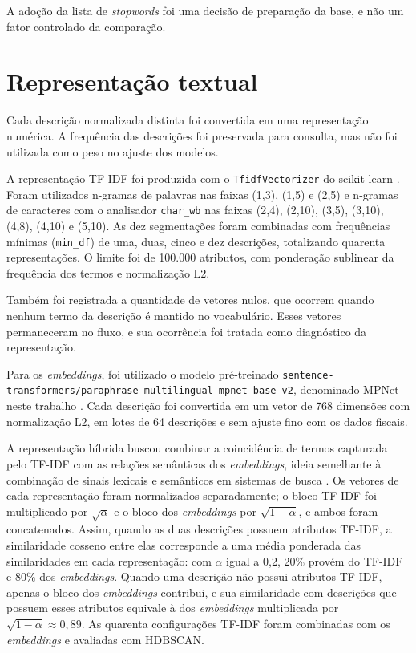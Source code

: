 \documentclass[english,brazilian]{UNISINOSmonografia}
\begin{document}
A adoção da lista de \textit{stopwords} foi uma decisão de preparação da base, e não um fator controlado da comparação.

\section{Representação textual}
\label{sec:representacao}

Cada descrição normalizada distinta foi convertida em uma representação numérica. A frequência das descrições foi preservada para consulta, mas não foi utilizada como peso no ajuste dos modelos.

A representação TF-IDF foi produzida com o \texttt{TfidfVectorizer} do scikit-learn \cite{sklearn-tfidf}. Foram utilizados n-gramas de palavras nas faixas (1,3), (1,5) e (2,5) e n-gramas de caracteres com o analisador \texttt{char\_wb} nas faixas (2,4), (2,10), (3,5), (3,10), (4,8), (4,10) e (5,10). As dez segmentações foram combinadas com frequências mínimas (\texttt{min\_df}) de uma, duas, cinco e dez descrições, totalizando quarenta representações. O limite foi de 100.000 atributos, com ponderação sublinear da frequência dos termos e normalização L2.

Também foi registrada a quantidade de vetores nulos, que ocorrem quando nenhum termo da descrição é mantido no vocabulário. Esses vetores permaneceram no fluxo, e sua ocorrência foi tratada como diagnóstico da representação.

Para os \textit{embeddings}, foi utilizado o modelo pré-treinado \nolinkurl{sentence-transformers/paraphrase-multilingual-mpnet-base-v2}, denominado MPNet neste trabalho \cite{sentencetransformers-mpnet}. Cada descrição foi convertida em um vetor de 768 dimensões com normalização L2, em lotes de 64 descrições e sem ajuste fino com os dados fiscais.

A representação híbrida buscou combinar a coincidência de termos capturada pelo TF-IDF com as relações semânticas dos \textit{embeddings}, ideia semelhante à combinação de sinais lexicais e semânticos em sistemas de busca \cite{kuzi2020hybrid}. Os vetores de cada representação foram normalizados separadamente; o bloco TF-IDF foi multiplicado por $\sqrt{\alpha}$ e o bloco dos \textit{embeddings} por $\sqrt{1-\alpha}$, e ambos foram concatenados. Assim, quando as duas descrições possuem atributos TF-IDF, a similaridade cosseno entre elas corresponde a uma média ponderada das similaridades em cada representação: com $\alpha$ igual a 0,2, 20\% provém do TF-IDF e 80\% dos \textit{embeddings}. Quando uma descrição não possui atributos TF-IDF, apenas o bloco dos \textit{embeddings} contribui, e sua similaridade com descrições que possuem esses atributos equivale à dos \textit{embeddings} multiplicada por $\sqrt{1-\alpha}\approx 0{,}89$. As quarenta configurações TF-IDF foram combinadas com os \textit{embeddings} e avaliadas com HDBSCAN.
\end{document}
